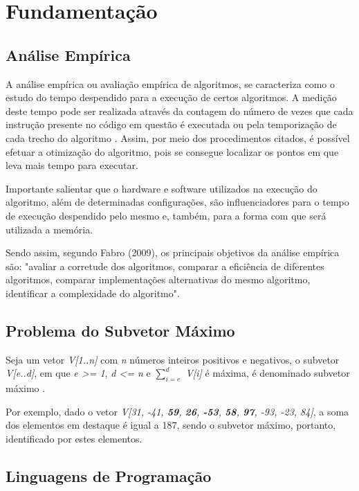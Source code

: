\documentclass[
	12pt,				%
	oneside,   	        %
	a4paper,			%
	english,			%
	french,				%
	spanish,			%
	brazil,				%
	]{pacotes/abntex2}
\begin{document}
\section{Fundamentação}
\label{sec:fundamentacao}
    \subsection{Análise Empírica}
        A análise empírica ou avaliação empírica de algoritmos, se caracteriza como o estudo do tempo despendido para a execução de certos algoritmos. A medição deste tempo pode ser realizada através da contagem do número de vezes que cada instrução presente no código em questão é executada ou pela temporização de cada trecho do algoritmo \cite{art8}.
        Assim, por meio dos procedimentos citados, é possível efetuar a otimização do algoritmo, pois se consegue localizar os pontos em que leva mais tempo para executar.
        
        Importante salientar que o hardware e software utilizados na execução do algoritmo, além de determinadas configurações, são influenciadores para o tempo de execução despendido pelo mesmo e, também, para a forma com que será utilizada a memória.
        
        Sendo assim, segundo Fabro (2009), os principais objetivos da análise empírica são: "avaliar a corretude dos algoritmos, comparar a eficiência de diferentes algoritmos, comparar implementações alternativas do mesmo algoritmo, identificar a complexidade do algoritmo".
    
    \subsection{Problema do Subvetor Máximo}
        Seja um vetor \textit{V[1..n]} com \textit{n} números inteiros positivos e negativos, o subvetor \textit{V[e..d]}, em que \textit{e >= 1}, \textit{d <= n} e $\sum_{i=e}^{d}$ \textit{V[i]}
        é máxima, é denominado subvetor máximo \cite{art7}.
        
        Por exemplo, dado o vetor \textit{V[31, -41, \textbf{59}, \textbf{26}, \textbf{-53}, \textbf{58}, \textbf{97}, -93, -23, 84]}, a soma dos elementos em destaque é igual a 187, sendo o subvetor máximo, portanto, identificado por estes elementos.
    
    \subsection{Linguagens de Programação}
\end{document}
